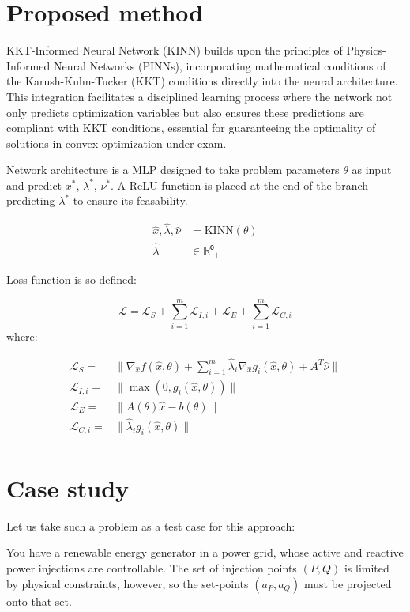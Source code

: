 \documentclass[
]{article}
\begin{document}
\section{Proposed method}\label{proposed-method}

KKT-Informed Neural Network (KINN) builds upon the principles of
Physics-Informed Neural Networks (PINNs), incorporating mathematical
conditions of the Karush-Kuhn-Tucker (KKT) conditions directly into the
neural architecture. This integration facilitates a disciplined learning
process where the network not only predicts optimization variables but
also ensures these predictions are compliant with KKT conditions,
essential for guaranteeing the optimality of solutions in convex
optimization under exam.

Network architecture is a MLP designed to take problem parameters
\(\theta\) as input and predict \(x^*\), \(\lambda^*\), \(\nu^*\). A
ReLU function is placed at the end of the branch predicting
\(\lambda^*\) to ensure its feasability.

\begin{align}
\hat{x}, \hat{\lambda}, \hat{\nu} &= \textrm{KINN}(\theta)\\
\hat{\lambda} &\in \mathbb{R}⁰_+
\end{align}

Loss function is so defined:

\[
\mathcal{L} = \mathcal{L}_S + \sum_{i=1}^m\mathcal{L}_{I,i} + \mathcal{L}_E  + \sum_{i=1}^m\mathcal{L}_{C,i} 
\] where:

\begin{align}
    \mathcal{L}_S =& \|\nabla_{\hat{x}} f(\hat{x}, \theta) + \sum\nolimits_{i=1}^m \hat{\lambda}_i\nabla_{\hat{x}} g_i(\hat{x}, \theta) + A^T\hat{\nu}\|\\ 
    \mathcal{L}_{I,i}  =& \|\max(0, g_i(\hat{x}, \theta))\|\\
    \mathcal{L}_E =& \|A(\theta) \hat{x} - b(\theta)\|\\
    \mathcal{L}_{C,i}  =& \|\hat{\lambda}_i g_i(\hat{x}, \theta)\|\\
\end{align}

\section{Case study}\label{case-study}

Let us take such a problem as a test case for this approach:

You have a renewable energy generator in a power grid, whose active and
reactive power injections are controllable. The set of injection points
\((P,Q)\) is limited by physical constraints, however, so the set-points
\((a_P, a_Q)\) must be projected onto that set.
\end{document}
